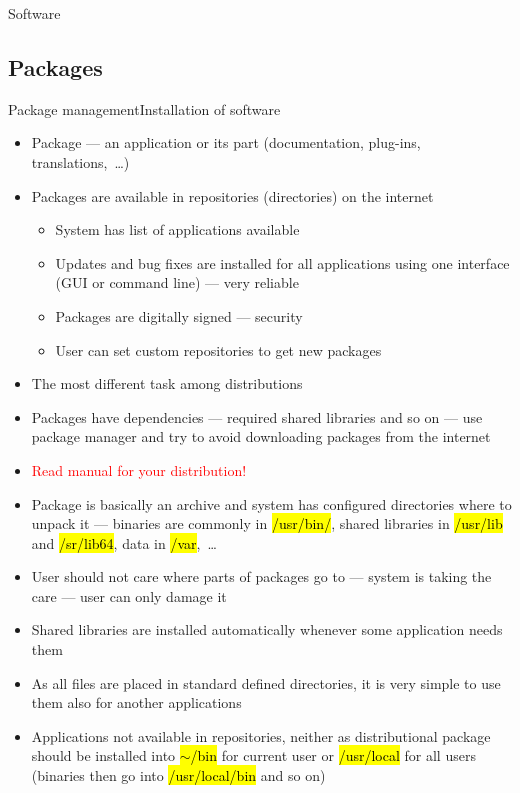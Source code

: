 \documentclass[compress, ucs, xelatex, 11pt, xcolor=svgnames,
  hyperref={
    bookmarks=true,
    unicode=true,
    colorlinks=true,
    pdftitle={Linux, command line and MetaCentrum},
    plainpages=false,
    pdfauthor={Vojtech Zeisek},
    pdfsubject={Course about use of Linux command line, writing shell scripts and using MetaCentrum of CESNET},
    pdfcreator={XeLaTeX},
    pdfkeywords={Linux, GNU, BASH, shell, command line, MetaCentrum},
    linkcolor=DarkRed,
    anchorcolor=DarkBlue,
    citecolor=Indigo,
    filecolor=NavyBlue,
    menucolor=DarkMagenta,
    urlcolor=DarkBlue,
    pdftex},
  url={hyphens, lowtilde} %
  ]{beamer}
\renewcommand{\texttt}[1]{\hl{\ttfamily #1}}
\renewcommand{\alert}[1]{\textcolor{red}{#1}}
\begin{document}
\begin{frame}{Software}
  \tableofcontents[currentsection, sectionstyle=show/hide, hideothersubsections]
\end{frame}

\subsection{Packages}

\begin{frame}[allowframebreaks]{Package management}{Installation of software}
  \begin{itemize}
    \item Package --- an application or its part (documentation, plug-ins, translations,~\ldots)
    \item Packages are available in repositories (directories) on the internet
    \begin{itemize}
      \item System has list of applications available
      \item Updates and bug fixes are installed for all applications using one interface (GUI or command line) --- very reliable
      \item Packages are digitally signed --- security
      \item User can set custom repositories to get new packages
    \end{itemize}
    \item The most different task among distributions
    \item Packages have dependencies --- required shared libraries and so on --- use package manager and try to avoid downloading packages from the internet
    \item \alert{Read manual for your distribution!}
    \item Package is basically an archive and system has configured directories where to unpack it --- binaries are commonly in \texttt{/usr/bin/}, shared libraries in \texttt{/usr/lib} and \texttt{/sr/lib64}, data in \texttt{/var},~\ldots
    \item User should not care where parts of packages go to --- system is taking the care --- user can only damage it
    \item Shared libraries are installed automatically whenever some application needs them
    \item As all files are placed in standard defined directories, it is very simple to use them also for another applications
    \item Applications not available in repositories, neither as distributional package should be installed into \texttt{$\sim$/bin} for current user or \texttt{/usr/local} for all users (binaries then go into \texttt{/usr/local/bin} and so on)

\end{itemize}
\end{frame}
\end{document}
